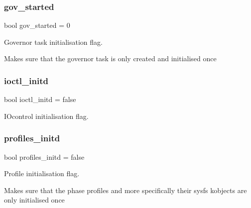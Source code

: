 \subsubsection{\texorpdfstring{gov\+\_\+started}{gov\_started}}
{\footnotesize\ttfamily bool gov\+\_\+started = 0\hspace{0.3cm}{\ttfamily [static]}}



Governor task initialisation flag. 

Makes sure that the governor task is only created and initialised once \mbox{\label{group__initialisation__flags_gabda9d595ebe2d5ff3270e7ee4a731846}} 
\subsubsection{\texorpdfstring{ioctl\+\_\+initd}{ioctl\_initd}}
{\footnotesize\ttfamily bool ioctl\+\_\+initd = false}



I\+Ocontrol initialisation flag. 

\mbox{\label{group__initialisation__flags_gac119eb310007378a0e5dc060602ce66c}} 
\subsubsection{\texorpdfstring{profiles\+\_\+initd}{profiles\_initd}}
{\footnotesize\ttfamily bool profiles\+\_\+initd = false}



Profile initialisation flag. 

Makes sure that the phase profiles and more specifically their sysfs kobjects are only initialised once 